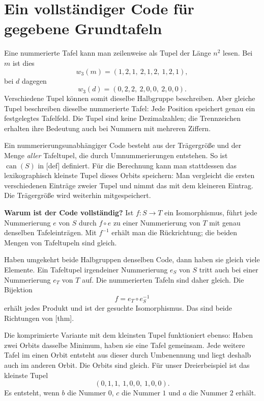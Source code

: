 \section*{Ein vollständiger Code für gegebene Grundtafeln}

Eine nummerierte Tafel kann man zeilenweise als Tupel der Länge \(n^2\)
lesen. Bei \(m\) ist dies
\[
  w_3(m)=(1,2,1,\ 2,1,2,\ 1,2,1),
\]
bei \(d\) dagegen
\[
  w_3(d)=(0,2,2,\ 2,0,0,\ 2,0,0).
\]
Verschiedene Tupel können somit dieselbe Halbgruppe beschreiben.
Aber gleiche Tupel beschreiben dieselbe nummerierte Tafel: Jede
Position speichert genau ein festgelegtes Tafelfeld. Die Tupel sind
keine Dezimalzahlen; die Trennzeichen erhalten ihre Bedeutung auch
bei Nummern mit mehreren Ziffern.

Ein nummerierungsunabhängiger Code besteht aus der Trägergröße und
der Menge \emph{aller} Tafeltupel, die durch Umnummerierungen entstehen.
So ist \(\operatorname{can}(S)\) in
[def] definiert.
Für die Berechnung kann man stattdessen das lexikographisch kleinste
Tupel dieses Orbits speichern: Man vergleicht die ersten verschiedenen
Einträge zweier Tupel und nimmt das mit dem kleineren Eintrag.
Die Trägergröße wird weiterhin mitgespeichert.

\medskip\noindent\textbf{Warum ist der Code vollständig?}
Ist \(f\colon S\to T\) ein Isomorphismus, führt jede Nummerierung
\(e\) von \(S\) durch \(f\circ e\) zu einer Nummerierung von \(T\)
mit genau denselben Tafeleinträgen. Mit \(f^{-1}\) erhält man die
Rückrichtung; die beiden Mengen von Tafeltupeln sind gleich.

Haben umgekehrt beide Halbgruppen denselben Code, dann haben sie
gleich viele Elemente. Ein Tafeltupel irgendeiner Nummerierung
\(e_S\) von \(S\) tritt auch bei einer Nummerierung \(e_T\) von
\(T\) auf. Die nummerierten Tafeln sind daher gleich. Die Bijektion
\[
  f=e_T\circ e_S^{-1}
\]
erhält jedes Produkt und ist der gesuchte Isomorphismus. Das sind
beide Richtungen von
[thm].

Die komprimierte Variante mit dem kleinsten Tupel funktioniert ebenso:
Haben zwei Orbits dasselbe Minimum, haben sie eine Tafel gemeinsam.
Jede weitere Tafel im einen Orbit entsteht aus dieser durch Umbenennung
und liegt deshalb auch im anderen Orbit. Die Orbits sind gleich.
Für unser Dreierbeispiel ist das kleinste Tupel
\[
  (0,1,1,\ 1,0,0,\ 1,0,0).
\]
Es entsteht, wenn \(b\) die Nummer \(0\), \(c\) die Nummer \(1\)
und \(a\) die Nummer \(2\) erhält.

